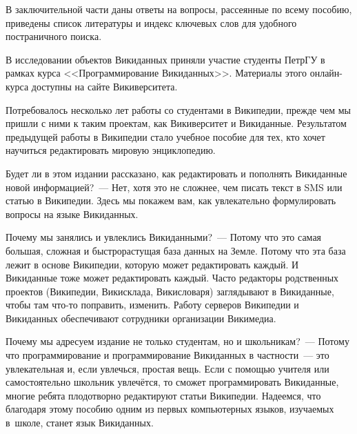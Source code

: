 В заключительной части %
даны ответы на вопросы, рассеянные по всему пособию, приведены список литературы 
и индекс ключевых слов для удобного постраничного поиска.





\newpage
В исследовании объектов Викиданных приняли участие студенты ПетрГУ в рамках курса <<Программирование Викиданных>>. 
Материалы этого онлайн-курса доступны на сайте Викиверситета. 

Потребовалось несколько лет работы со студентами в Википедии, прежде чем мы пришли с ними к таким проектам, 
как Викиверситет и Викиданные. 
Результатом предыдущей работы в Википедии стало учебное пособие для тех, 
кто хочет научиться редактировать мировую энциклопедию.



Будет ли в этом издании рассказано, 
как редактировать и пополнять Викиданные новой информацией?~--- Нет, 
хотя это не сложнее, чем писать текст в SMS или статью в Википедии. 
Здесь мы покажем вам, как увлекательно формулировать вопросы на языке Викиданных. 


Почему мы занялись и увлеклись Викиданными?~--- Потому что это самая большая, сложная 
и быстрорастущая база данных на Земле. 
Потому что эта база лежит в основе Википедии, которую может редактировать каждый.
И Викиданные тоже может редактировать каждый. 
Часто редакторы родственных проектов (Википедии, Викисклада, Викисловаря) 
заглядывают в Викиданные, чтобы там что-то поправить, изменить. 
Работу серверов Википедии и Викиданных обеспечивают сотрудники организации Викимедиа. 



Почему мы адресуем издание не только студентам, но и школьникам?~--- Потому что 
программирование и программирование Викиданных в частности~--- это 
увлекательная и, если увлечься, простая вещь. 
Если с помощью учителя или самостоятельно школьник увлечётся, 
то сможет программировать Викиданные, 
многие ребята плодотворно редактируют статьи Википедии. 
Надеемся, что благодаря этому пособию одним из первых компьютерных языков, 
изучаемых в~школе, станет язык Викиданных.

